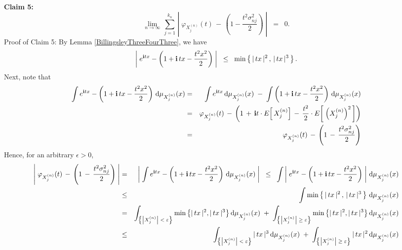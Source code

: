 \vskip 0.5cm
\noindent
\textbf{Claim 5:}
\begin{equation*}
\lim_{n\rightarrow\infty}\,
\sum_{j=1}^{k_{n}}\,
\left\vert\;\varphi_{X^{(n)}_{j}}(t) \, - \, \left(1 - \dfrac{t^{2}\sigma^{2}_{nj}}{2}\right)\;\right\vert
\;\;=\;\; 0.
\end{equation*}
{\small Proof of Claim 5: By Lemma \ref{BillingsleyThreeFourThree}, we have
\begin{equation*}
\left\vert\;
e^{\textnormal{\bf i} tx} - \left(1 + \textnormal{\bf i}\,tx - \dfrac{t^2x^2}{2}\right)
\;\right\vert
\;\;\leq\;\;
\min\left\{\,
\vert\,tx\,\vert^{2}
\,,\,
\vert\,tx\,\vert^{3}
\,\right\}.
\end{equation*}
Next, note that
\begin{eqnarray*}
\int e^{\textnormal{\bf i} tx} - \left(1 + \textnormal{\bf i}\,tx - \dfrac{t^2x^2}{2}\right)\,\textnormal{d}\mu_{X^{(n)}_{j}}(x)
&=&
\int e^{\textnormal{\bf i} tx} \,\textnormal{d}\mu_{X^{(n)}_{j}}(x) \; -\; \int \left(1 + \textnormal{\bf i}\,tx - \dfrac{t^2x^2}{2}\right) \,\textnormal{d}\mu_{X^{(n)}_{j}}(x)
\\
&=&
\varphi_{X^{(n)}_{j}}(t) \, - \, \left(1 \, + \, \textnormal{\bf i} t \cdot E\!\left[\,X^{(n)}_{j}\right] \, - \, \dfrac{t^{2}}{2}\cdot E\!\left[\;\left(X^{(n)}_{j}\right)^{2}\,\right]\right)
\\
&=&
\varphi_{X^{(n)}_{j}}(t) \, - \, \left(1 \, - \, \dfrac{t^{2}\sigma^{2}_{nj}}{2}\right)
\end{eqnarray*}
Hence, for an arbitrary $\epsilon > 0$,
\begin{eqnarray*}
\left\vert\;
\varphi_{X^{(n)}_{j}}(t) \, - \, \left(1 \, - \, \dfrac{t^{2}\sigma^{2}_{nj}}{2}\right)
\;\right\vert
&=&\left\vert\;
\int e^{\i tx} - \left(1 + \i\,tx - \dfrac{t^2x^2}{2}\right)\,\d\mu_{X^{(n)}_{j}}(x)
\;\right\vert
\;\;\leq\;\;
\int
\left\vert\;
e^{\i tx} - \left(1 + \i\,tx - \dfrac{t^2x^2}{2}\right)
\;\right\vert
\,\d\mu_{X^{(n)}_{j}}(x)
\\
&\leq&
\int
\min\left\{\,
\vert\,tx\,\vert^{2}
\,,\,
\vert\,tx\,\vert^{3}
\,\right\}
\,\d\mu_{X^{(n)}_{j}}(x)
\\
&=&
\int_{\left\{\left\vert X^{(n)}_{j} \right\vert\;<\;\varepsilon\right\}}\min\left\{\vert\,tx\,\vert^{2},\vert\,tx\,\vert^{3}\right\}\d\mu_{X^{(n)}_{j}}(x)
\;+\;
\int_{\left\{\left\vert X^{(n)}_{j} \right\vert\;\geq\;\varepsilon\right\}}\min\left\{\vert\,tx\,\vert^{2},\vert\,tx\,\vert^{3}\right\}\d\mu_{X^{(n)}_{j}}(x)
\\
&\leq&
\int_{\left\{\left\vert X^{(n)}_{j} \right\vert\;<\;\varepsilon\right\}} \vert\,tx\,\vert^{3} \,\d\mu_{X^{(n)}_{j}}(x)
\;+\;
\int_{\left\{\left\vert X^{(n)}_{j} \right\vert\;\geq\;\varepsilon\right\}} \vert\,tx\,\vert^{2} \,\d\mu_{X^{(n)}_{j}}(x)

\end{eqnarray*}}
